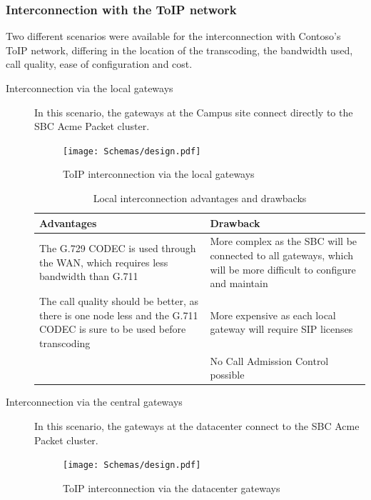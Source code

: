 \subsubsection{Interconnection with the ToIP network}
	Two different scenarios were available for the interconnection with Contoso's ToIP network, differing in the location of the transcoding, the bandwidth used, call quality, ease of configuration and cost.
	\begin{description}
		\item[Interconnection via the local gateways] 
			In this scenario, the gateways at the Campus site connect directly to the SBC Acme Packet cluster.
			\begin{figure}[H]
				\centering
				\texttt{[image: Schemas/design.pdf]}
				\caption{ToIP interconnection via the local gateways}
				\label{fig:case_toip_local}
			\end{figure}
			
			\begin{table}[H]
			\centering
			\begin{tabularx}{\textwidth}{X|X}
				\textbf{Advantages} & \textbf{Drawback} \\ \hline 
				The G.729 CODEC is used through the WAN, which requires less bandwidth than G.711 & More complex as the SBC will be connected to all gateways, which will be more difficult to configure and maintain \\ \hline 
				The call quality should be better, as there is one node less and the G.711 CODEC is sure to be used before transcoding & More expensive as each local gateway will require SIP licenses \\ \hline 
				& No Call Admission Control possible
			\end{tabularx}
			\caption{\label{tab:case_toip_local} Local interconnection advantages and drawbacks}
			\end{table}			
	
		\item[Interconnection via the central gateways] 
			In this scenario, the gateways at the datacenter connect to the SBC Acme Packet cluster.
			\begin{figure}[H]
				\centering
				\texttt{[image: Schemas/design.pdf]}
				\caption{ToIP interconnection via the datacenter gateways}
				\label{fig:case_toip_datacenter}
			\end{figure}
			

\end{description}
